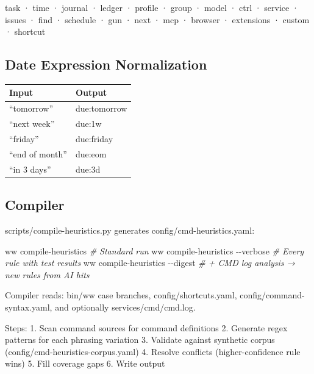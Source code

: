 \documentclass[11pt, a4paper, DIV=14]{scrartcl}
\renewcommand{\texttt}[1]{{\ttfamily\fontsize{8.5}{10.5}\selectfont\color{BabbNavy}#1}}
\newenvironment{Shaded}{%
  \vspace{4pt}%
  \begin{lrbox}{\ShadedBox}%
  \begin{minipage}{\dimexpr\linewidth-2\fboxsep\relax}%
  \vspace{4pt}%
}{%
  \vspace{4pt}%
  \end{minipage}%
  \end{lrbox}%
  \noindent\colorbox{CodeBg}{\usebox{\ShadedBox}}%
  \par\vspace{4pt}%
}
\newcommand{\AttributeTok}[1]{\textcolor{BabbTeal}{#1}}
\newcommand{\CommentTok}[1]{\textcolor{BabbGray}{\textit{#1}}}
\newcommand{\ExtensionTok}[1]{#1}
\newcommand{\NormalTok}[1]{#1}
\newenvironment{Highlighting}{\ttfamily\fontsize{8.2}{11}\selectfont}{}
\newcounter{none}
\begin{document}
task · time · journal · ledger · profile · group · model · ctrl ·
service · issues · find · schedule · gun · next · mcp · browser ·
extensions · custom · shortcut

\subsection{Date Expression
Normalization}\label{date-expression-normalization}

{\def\LTcaptype{none} %
\begin{longtable}[]{@{}ll@{}}
\toprule\noalign{}
Input & Output \\
\midrule\noalign{}
\endhead
\bottomrule\noalign{}
\endlastfoot
``tomorrow'' & \texttt{due:tomorrow} \\
``next week'' & \texttt{due:1w} \\
``friday'' & \texttt{due:friday} \\
``end of month'' & \texttt{due:eom} \\
``in 3 days'' & \texttt{due:3d} \\
\end{longtable}
}

\subsection{Compiler}\label{compiler}

\texttt{scripts/compile-heuristics.py} generates
\texttt{config/cmd-heuristics.yaml}:

\begin{Shaded}
\begin{Highlighting}[]
\ExtensionTok{ww}\NormalTok{ compile{-}heuristics              }\CommentTok{\# Standard run}
\ExtensionTok{ww}\NormalTok{ compile{-}heuristics }\AttributeTok{{-}{-}verbose}    \CommentTok{\# Every rule with test results}
\ExtensionTok{ww}\NormalTok{ compile{-}heuristics }\AttributeTok{{-}{-}digest}     \CommentTok{\# + CMD log analysis → new rules from AI hits}
\end{Highlighting}
\end{Shaded}

Compiler reads: \texttt{bin/ww} case branches,
\texttt{config/shortcuts.yaml}, \texttt{config/command-syntax.yaml}, and
optionally \texttt{services/cmd/cmd.log}.

Steps: 1. Scan command sources for command definitions 2. Generate regex
patterns for each phrasing variation 3. Validate against synthetic
corpus (\texttt{config/cmd-heuristics-corpus.yaml}) 4. Resolve conflicts
(higher-confidence rule wins) 5. Fill coverage gaps 6. Write output
\end{document}
